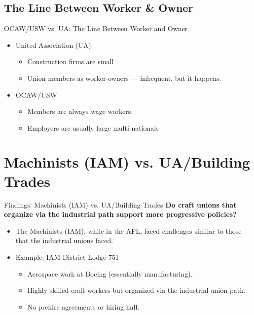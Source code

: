 \documentclass{beamer}
\begin{document}
\subsection{The Line Between Worker \& Owner}
\begin{frame}{OCAW/USW vs. UA: The Line Between Worker and Owner}
	\begin{itemize}
		\item United Association (UA)
		\begin{itemize}
			\item Construction firms are small
			\item Union members as worker-owners — infrequent, but it happens.
		\end{itemize}
		\item OCAW/USW
			\begin{itemize}
				\item Members are always wage workers.
				\item Employers are usually large multi-nationals
			\end{itemize}
	\end{itemize}
\end{frame}


\section{Machinists (IAM) vs. UA/Building Trades}
\begin{frame}{Findings: Machinists (IAM) vs. UA/Building Trades}
\textbf{Do craft unions that organize via the industrial path support more progressive policies?}\newline
	\begin{itemize}
		\item The Machinists (IAM), while in the AFL, faced challenges similar to those that the industrial unions faced.
		\item Example: IAM District Lodge 751
		\begin{itemize}
			\item Aerospace work at Boeing (essentially manufacturing).
			\item Highly skilled craft workers but organized via the industrial union path.
			\item No prehire agreements or hiring hall.
		\end{itemize}
	\end{itemize}
\end{frame}
\end{document}
